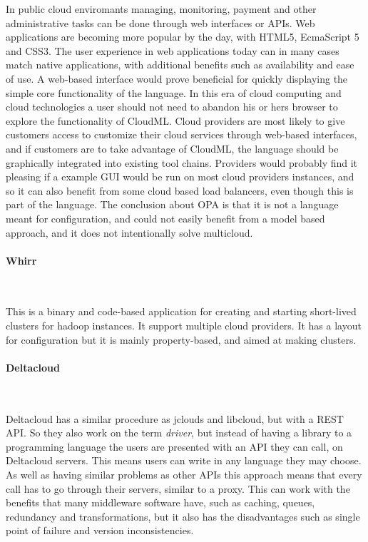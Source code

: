 In public cloud enviromants managing, monitoring, payment and other administrative 
tasks can be done through web interfaces or APIs. 
Web applications are becoming more popular by the day, with HTML5, EcmaScript 5 and CSS3. 
The user experience in web applications today can in many cases match native applications, with additional benefits such as availability and ease of use.
A web-based interface would prove beneficial for quickly displaying the simple core functionality of the language. 
In this era of cloud computing and cloud technologies a user should not need to abandon his or hers browser to explore the functionality of CloudML.
Cloud providers are most likely to give customers access to customize their cloud services through web-based interfaces, 
and if customers are to take advantage of CloudML, the language should be graphically integrated into existing tool chains. 
Providers would probably find it pleasing if a example GUI would be run on most cloud providers instances, 
and so it can also benefit from some cloud based load balancers, even though this is part of the language. 
The conclusion about OPA is that it is not a language meant for configuration, and could not easily benefit from a model based approach, 
and it does not intentionally solve multicloud.

\paragraph{Whirr}~\cite{whirr}


This is a binary and code-based application for creating and starting short-lived clusters for hadoop instances.
It support multiple cloud providers. It has a layout for configuration but it is mainly property-based, and aimed at making clusters. 

\paragraph{Deltacloud}~\cite{deltacloud}

Deltacloud has a similar procedure as jclouds and libcloud, but with a REST API. 
So they also work on the term \emph{driver}, but instead of having a library to a programming language the users are presented with an API they can call, 
on Deltacloud servers. This means users can write in any language they may choose. 
As well as having similar problems as other APIs this approach means that every call has to go through their servers, 
similar to a proxy. This can work with the benefits that many middleware software have, such as caching, queues, 
redundancy and transformations, but it also has the disadvantages such as single point of failure and version inconsistencies.

